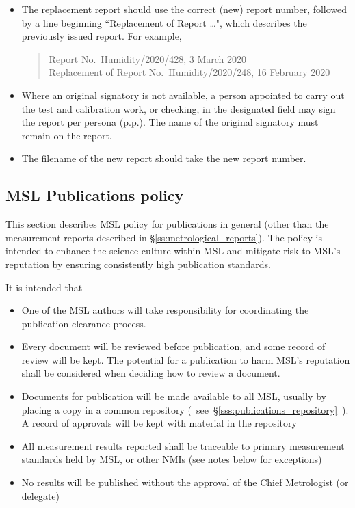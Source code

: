 \begin{itemize}
\item The replacement report should use the correct (new) report number, followed by a line beginning ``Replacement of Report \ldots", which describes the previously issued report. For example, 
\begin{quote}
Report No.\ Humidity/2020/428, 3 March 2020\\
 Replacement of Report No.\ Humidity/2020/248, 16 February 2020
\end{quote}
\item Where an original signatory is not available, a person appointed to carry out the test and calibration work, or checking, in the designated field may sign the report per persona (p.p.).  The name of the original signatory must remain on the report.
\item The filename of the new report should take the new report number.
\end{itemize}

\subsection{MSL Publications policy}
\label{ss:msl_publications_policy}

This section describes MSL policy for publications in general (other than the measurement reports described in \S\ref{ss:metrological_reports}). The policy is intended to enhance the science culture within MSL and mitigate risk to MSL's reputation by ensuring consistently high publication standards.   


It is intended that
\begin{itemize}
\item One of the MSL authors will take responsibility for coordinating the publication clearance process. 

\item  Every document will be reviewed before publication, and some record of review will be kept. The potential for a publication to harm MSL's reputation shall be considered when deciding how to review a document. 

\item  Documents for publication will be made available to all MSL, usually by placing a copy in a common repository (~see~\S\ref{sss:publications_repository}~). A record of approvals will be kept with material in the repository 



\item  All measurement results reported shall be traceable to primary measurement standards held by MSL, or other NMIs (see notes below for exceptions)
\item  No results will be published without the approval of the Chief Metrologist (or delegate) 
\end{itemize}

